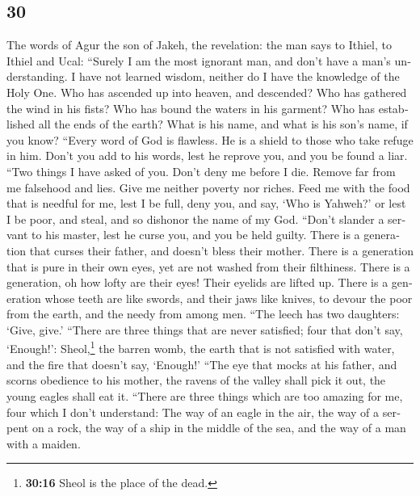 \begin{paracol}{2}
\begin{otherlanguage}{english}
\hypertarget{section-59}{%
\section{30}\label{section-59}}

 The words of Agur the son of Jakeh, the revelation: the
man says to Ithiel, to Ithiel and Ucal:  ``Surely I am the
most ignorant man, and don't have a man's understanding. 
I have not learned wisdom, neither do I have the knowledge of the Holy
One.  Who has ascended up into heaven, and descended? Who
has gathered the wind in his fists? Who has bound the waters in his
garment? Who has established all the ends of the earth? What is his
name, and what is his son's name, if you know?  ``Every
word of God is flawless. He is a shield to those who take refuge in him.
 Don't you add to his words, lest he reprove you, and you
be found a liar.  ``Two things I have asked of you. Don't
deny me before I die.  Remove far from me falsehood and
lies. Give me neither poverty nor riches. Feed me with the food that is
needful for me,  lest I be full, deny you, and say, `Who
is Yahweh?' or lest I be poor, and steal, and so dishonor the name of my
God.  ``Don't slander a servant to his master, lest he
curse you, and you be held guilty.  There is a generation
that curses their father, and doesn't bless their mother.
 There is a generation that is pure in their own eyes,
yet are not washed from their filthiness.  There is a
generation, oh how lofty are their eyes! Their eyelids are lifted up.
 There is a generation whose teeth are like swords, and
their jaws like knives, to devour the poor from the earth, and the needy
from among men.  ``The leech has two daughters: `Give,
give.' ``There are three things that are never satisfied; four that
don't say, `Enough!':  Sheol,\footnote{\textbf{30:16}
  Sheol is the place of the dead.} the barren womb, the earth that is
not satisfied with water, and the fire that doesn't say, `Enough!'
 ``The eye that mocks at his father, and scorns obedience
to his mother, the ravens of the valley shall pick it out, the young
eagles shall eat it.  ``There are three things which are
too amazing for me, four which I don't understand:  The
way of an eagle in the air, the way of a serpent on a rock, the way of a
ship in the middle of the sea, and the way of a man with a maiden.

\end{otherlanguage}
\end{paracol}

